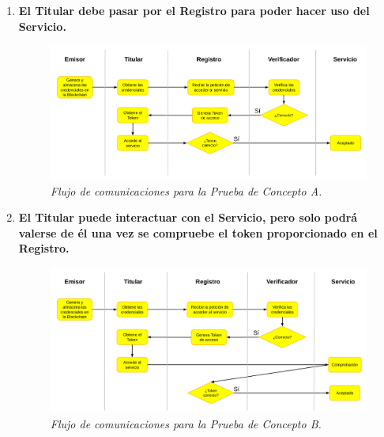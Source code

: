 \documentclass[../main.tex]{subfiles}
\begin{document}
\newpage

\begin{enumerate}[label=\textbf{\Alph*.}]
    \item \textbf{El Titular debe pasar por el Registro para poder hacer uso del Servicio.} \\
    \begin{figure}[htbp]
        \centering
        \includegraphics[width=1\linewidth]{images/PoC_A.png}
        \caption{\textit{Flujo de comunicaciones para la Prueba de Concepto A.}}
    \end{figure}

    \vspace{1cm} 

    \item \textbf{El Titular puede interactuar con el Servicio, pero solo podrá valerse de él una vez se compruebe el token proporcionado en el Registro.} \\    
    \begin{figure}[htbp]
        \centering
        \includegraphics[width=1\linewidth]{images/PoC_B.png}
        \caption{\textit{Flujo de comunicaciones para la Prueba de Concepto B.}}
    \end{figure}

\end{enumerate}
\end{document}
